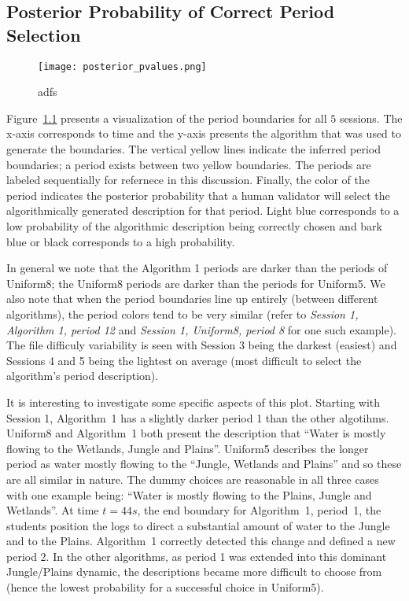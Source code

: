 \begin{appendices}

\chapter{Posterior Probability of Correct Period Selection}\label{cha:appendix1}
\begin{figure}
\centering
\texttt{[image: posterior\_pvalues.png]}
\caption{adfs}
\label{fig:posterior_pvalues}
\end{figure}

Figure~\ref{fig:posterior_pvalues} presents a visualization of the period boundaries for all $5$ sessions. The x-axis corresponds to time and the y-axis presents the algorithm that was used to generate the boundaries. The vertical yellow lines indicate the inferred period boundaries; a period exists between two yellow boundaries. The periods are labeled sequentially for refernece in this discussion. Finally, the color of the period indicates the posterior probability that a human validator will select the algorithmically generated description for that period. Light blue corresponds to a low probability of the algorithmic description being correctly chosen and bark blue or black corresponds to a high probability.

In general we note that the Algorithm 1 periods are darker than the periods of Uniform8; the Uniform8 periods are darker than the periods for Uniform5. We also note that when the period boundaries line up entirely (between different algorithms), the period colors tend to be very similar (refer to \textit{Session 1, Algorithm 1, period 12} and \textit{Session 1, Uniform8, period 8} for one such example). The file difficuly variability is seen with Session 3 being the darkest (easiest) and Sessions 4 and 5 being the lightest on average (most difficult to select the algorithm's period description).

It is interesting to investigate some specific aspects of this plot. Starting with Session 1, Algorithm~1 has a slightly darker period 1 than the other algotihms. Uniform8 and Algorithm~1 both present the description that ``Water is mostly flowing to the Wetlands, Jungle and Plains''. Uniform5 describes the longer period as water mostly flowing to the ``Jungle, Wetlands and Plains'' and so these are all similar in nature. The dummy choices are reasonable in all three cases with one example being: ``Water is mostly flowing to the Plains, Jungle and Wetlands''. At time $t=44s$, the end boundary for Algorithm~1, period~1, the students position the logs to direct a substantial amount of water to the Jungle and to the Plains. Algorithm~1 correctly detected this change and defined a new period 2. In the other algorithms, as period 1 was extended into this dominant Jungle/Plains dynamic, the descriptions became more difficult to choose from (hence the lowest probability for a successful choice in Uniform5).


\end{appendices}
